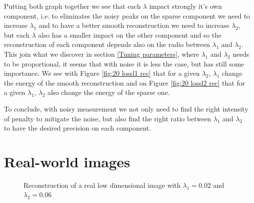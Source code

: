 \documentclass[a4paper,11pt,oneside]{report}
\theoremstyle{named}
\begin{document}
Putting both graph together we see that each $\lambda$ impact strongly it's own component, i.e. to eliminates the noisy peaks on the sparse component we need to increase $\lambda_1$ and to have a better smooth reconstruction we need to increase $\lambda_2$, but each $\lambda$ also has a smaller impact on the other component and so the reconstruction of each component depends also on the radio between $\lambda_1$ and $\lambda_2$. This join what we discover in section \ref{Tuning parameters}, where $\lambda_1$ and $\lambda_2$ needs to be proportional, it seems that with noise it is less the case, but has still some importance. We see with Figure \ref{fig:20 lossl1 rec} that for a given $\lambda_2$, $\lambda_1$ change the energy of the smooth reconstruction and on Figure \ref{fig:20 lossl2 rec} that for a given $\lambda_1$, $\lambda_2$ also change the energy of the sparse one. 

To conclude, with noisy measurement we not only need to find the right intensity of penalty to mitigate the noise, but also find the right ratio between $\lambda_1$ and $\lambda_2$ to have the desired precision on each component. 

\section{Real-world images}

\begin{figure}
    \centering
    \caption{Reconstruction of a real low dimensional image with $\lambda_1 = 0.02$ and $\lambda_2 = 0.06$}
    \label{fig:h7}
\end{figure}
\end{document}
